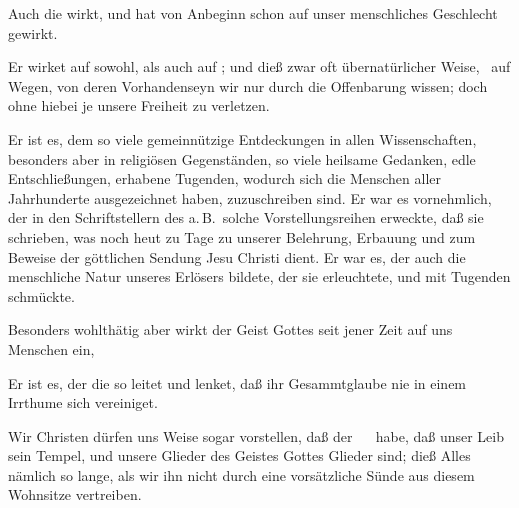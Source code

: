 Auch die  wirkt, und hat von Anbeginn schon auf unser menschliches Geschlecht gewirkt.
\begin{aufza}
\item Er wirket auf  sowohl, als auch auf ; und dieß zwar oft übernatürlicher Weise, \dh\ auf Wegen, von deren Vorhandenseyn wir nur durch die Offenbarung wissen; doch ohne hiebei je unsere Freiheit zu verletzen.
\item Er ist es, dem so viele gemeinnützige Entdeckungen in allen Wissenschaften, besonders aber in religiösen Gegenständen, so viele heilsame Gedanken, edle Entschließungen, erhabene Tugenden, wodurch sich die Menschen aller Jahrhunderte ausgezeichnet haben, zuzuschreiben sind. Er war es vornehmlich, der in den Schriftstellern des a.\,B.\ solche Vorstellungsreihen erweckte, daß sie schrieben, was noch heut zu Tage zu unserer Belehrung, Erbauung und zum Beweise der göttlichen Sendung Jesu Christi dient. Er war es, der auch die menschliche Natur unseres Erlösers bildete, der sie erleuchtete, und mit Tugenden schmückte.
\item Besonders wohlthätig aber wirkt der Geist Gottes seit jener Zeit auf uns Menschen ein, 
\item Er ist es, der die  so leitet und lenket, daß ihr Gesammtglaube nie in einem Irrthume sich vereiniget.
\item Wir Christen dürfen uns  Weise sogar vorstellen, daß der ~\  habe, daß unser Leib sein Tempel, und unsere Glieder des Geistes Gottes Glieder sind; dieß Alles nämlich so lange, als wir ihn nicht durch eine vorsätzliche Sünde aus diesem Wohnsitze vertreiben.
\end{aufza}

